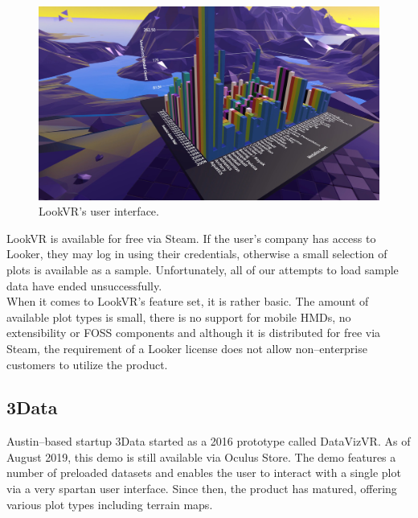 \documentclass{article}
\begin{document}
\begin{figure}[!h]
\centering
\includegraphics[scale=0.18]{images/lookvr}
\caption{LookVR's user interface.\cite{lookvrsteam}}
\label{fig:lookvr}
\end{figure}

LookVR is available for free via Steam.\cite{lookvrsteam} If the user's company has access to Looker, they may log in using their credentials, otherwise a small selection of plots is available as a sample. Unfortunately, all of our attempts to load sample data have ended unsuccessfully.\\

When it comes to LookVR's feature set, it is rather basic. The amount of available plot types is small, there is no support for mobile HMDs, no extensibility or FOSS components and although it is distributed for free via Steam, the requirement of a Looker license does not allow non--enterprise customers to utilize the product.\\

\subsection{3Data}

Austin--based startup 3Data started as a 2016 prototype called DataVizVR.\cite{datavizvroculus} As of August 2019, this demo is still available via Oculus Store. The demo features a number of preloaded datasets and enables the user to interact with a single plot via a very spartan user interface. Since then, the product has matured, offering various plot types including terrain maps.\cite{3data}\\
\end{document}

